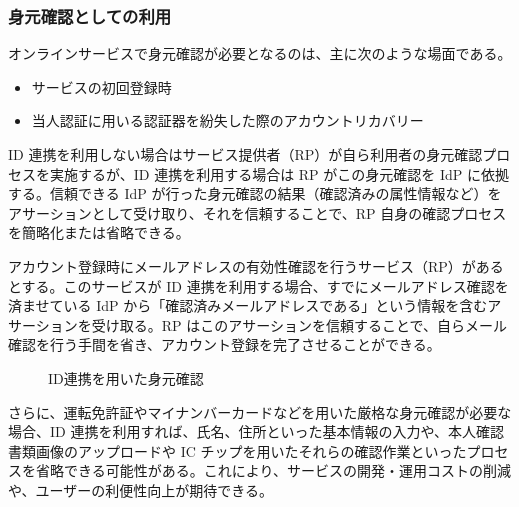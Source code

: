 \documentclass[uplatex]{jsarticle}
\def\label#1{}%
\begin{document}
\subsubsection{身元確認としての利用}

オンラインサービスで身元確認が必要となるのは、主に次のような場面である。
\begin{itemize}
\item サービスの初回登録時
\item 当人認証に用いる認証器を紛失した際のアカウントリカバリー
\end{itemize}

ID 連携を利用しない場合はサービス提供者（RP）が自ら利用者の身元確認プロセスを実施するが、ID 連携を利用する場合は RP がこの身元確認を IdP に依拠する。信頼できる IdP が行った身元確認の結果（確認済みの属性情報など）をアサーションとして受け取り、それを信頼することで、RP 自身の確認プロセスを簡略化または省略できる。

\begin{exa}[ID連携によるメールアドレス確認の省略]\label{exa:ch2b-verified-email}
アカウント登録時にメールアドレスの有効性確認を行うサービス（RP）があるとする。このサービスが ID 連携を利用する場合、すでにメールアドレス確認を済ませている IdP から「確認済みメールアドレスである」という情報を含むアサーションを受け取る。RP はこのアサーションを信頼することで、自らメール確認を行う手間を省き、アカウント登録を完了させることができる。
\end{exa}

\begin{figure}[H]
\centering
{}
\caption{ID連携を用いた身元確認}
\label{fig:ch2b-federation-proofing}
\end{figure}

さらに、運転免許証やマイナンバーカードなどを用いた厳格な身元確認が必要な場合、ID 連携を利用すれば、氏名、住所といった基本情報の入力や、本人確認書類画像のアップロードや IC チップを用いたそれらの確認作業といったプロセスを省略できる可能性がある。これにより、サービスの開発・運用コストの削減や、ユーザーの利便性向上が期待できる。
\end{document}
